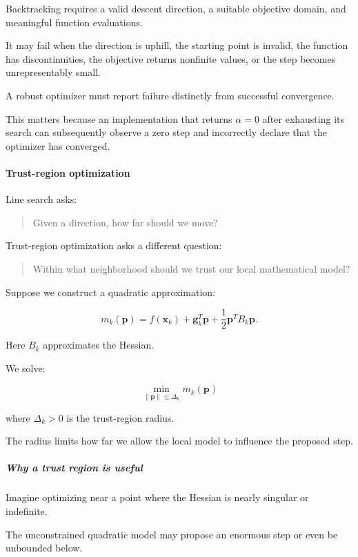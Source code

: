 Backtracking requires a valid descent direction, a suitable objective domain, and meaningful function evaluations.

It may fail when the direction is uphill, the starting point is invalid, the function has discontinuities, the objective returns nonfinite values, or the step becomes unrepresentably small.

A robust optimizer must report failure distinctly from successful convergence.

This matters because an implementation that returns \(\alpha=0\) after exhausting its search can subsequently observe a zero step and incorrectly declare that the optimizer has converged.

\paragraph{Trust-region optimization}\label{trust-region-optimization}

Line search asks:

\begin{quote}
Given a direction, how far should we move?
\end{quote}

Trust-region optimization asks a different question:

\begin{quote}
Within what neighborhood should we trust our local mathematical model?
\end{quote}

Suppose we construct a quadratic approximation:

\[
m_k(\mathbf p) = f(\mathbf x_k)+ \mathbf g_k^T\mathbf p+ \frac12\mathbf p^TB_k\mathbf p.
\]

Here \(B_k\) approximates the Hessian.

We solve:

\[
\boxed{ \min_{\|\mathbf p\|\le\Delta_k}m_k(\mathbf p) }
\]

where \(\Delta_k>0\) is the trust-region radius.

The radius limits how far we allow the local model to influence the proposed step.

\subparagraph{Why a trust region is useful}\label{why-a-trust-region-is-useful}

Imagine optimizing near a point where the Hessian is nearly singular or indefinite.

The unconstrained quadratic model may propose an enormous step or even be unbounded below.

